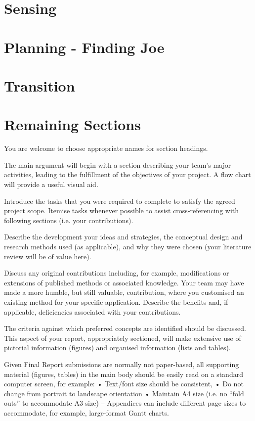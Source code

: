 \documentclass[]{article}
\begin{document}
\section{Sensing}


\section{Planning - Finding Joe}


\section{Transition}


\section{Remaining Sections}
\color{red}
You are welcome to choose appropriate names for section headings.

The main argument will begin with a section describing your team's major activities, leading to the fulfillment of the objectives of your project.  A flow chart will provide a useful visual aid.

Introduce the tasks that you were required to complete to satisfy the agreed project scope. Itemise tasks whenever possible to assist cross-referencing with following sections (i.e. your contributions).

Describe the development your ideas and strategies, the conceptual design and research methods used (as applicable), and why they were chosen (your literature review will be of value here).  

Discuss any original contributions including, for example, modifications or extensions of published methods or associated knowledge.  Your team may have made a more humble, but still valuable, contribution, where you customised an existing method for your specific application.  Describe the benefits and, if applicable, deficiencies associated with your contributions.

The criteria against which preferred concepts are identified should be discussed.  This aspect of your report, appropriately sectioned, will make extensive use of pictorial information (figures) and organised information (lists and tables).  

Given Final Report submissions are normally not paper-based, all supporting material (figures, tables) in the main body should be easily read on a standard computer screen, for example:
•	Text/font size should be consistent, 
•	Do not change from portrait to landscape orientation 
•	Maintain A4 size (i.e. no “fold outs” to accommodate A3 size) – Appendices can include different page sizes to accommodate, for example, large-format Gantt charts.
\end{document}
